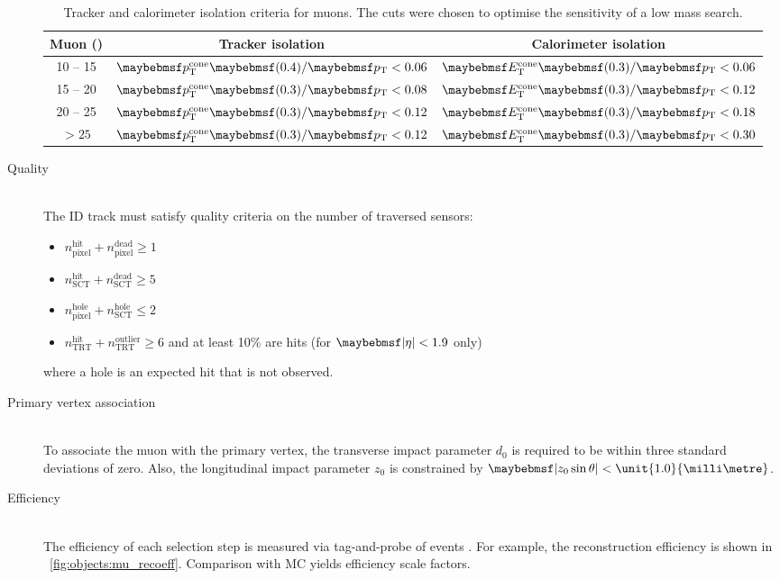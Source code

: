 \begin{description}
	\begin{table}[t]
		\begin{tabular}{c@{\hskip 0.3in}c@{\hskip 0.3in}c}
			\toprule
			Muon \pt (\GeV) & Tracker isolation & Calorimeter isolation \\
			\midrule
			10 -- 15 & $\ptcone{0.4}/\pt < 0.06$ & $\etcone{0.3}/\pt < 0.06$ \\
			15 -- 20 & $\ptcone{0.3}/\pt < 0.08$ & $\etcone{0.3}/\pt < 0.12$ \\
			20 -- 25 & $\ptcone{0.3}/\pt < 0.12$ & $\etcone{0.3}/\pt < 0.18$ \\
			$> 25$   & $\ptcone{0.3}/\pt < 0.12$ & $\etcone{0.3}/\pt < 0.30$ \\
			\bottomrule
		\end{tabular}
		\caption{Tracker and calorimeter isolation criteria for muons. The cuts were 
		chosen to optimise the sensitivity of a low mass \HWWlvlv search.}
		\label{tab:objects:mu_iso}
	\end{table}

\item[Quality] \hfill \\
	The ID track must satisfy quality criteria on the number of traversed sensors:
	\begin{itemize}[noitemsep,nolistsep]
		\item $n_{\text{pixel}}^{\text{hit}} + n_{\text{pixel}}^{\text{dead}} \geq 1$
		\item $n_{\text{SCT}}^{\text{hit}} + n_{\text{SCT}}^{\text{dead}} \geq 5$
		\item $n_{\text{pixel}}^{\text{hole}} + n_{\text{SCT}}^{\text{hole}} \leq 2$
		\item $n_{\text{TRT}}^{\text{hit}} + n_{\text{TRT}}^{\text{outlier}} \geq 6$ and 
		at least 10\% are hits (for $\mods{\eta} < 1.9$ only)
	\end{itemize}
	where a hole is an expected hit that is not observed.

\item[Primary vertex association] \hfill \\
	To associate the muon with the primary vertex, the transverse impact parameter $d_0$ 
	is required to be within three standard deviations of zero. Also, the longitudinal 
	impact parameter $z_0$ is constrained by $\mods{z_0 \sin\theta} < 
	\unit{1.0}{\milli\metre}$.

\item[Efficiency] \hfill \\
	The efficiency of each selection step is measured via tag-and-probe of 
	\HepProcess{\PZ \HepTo \Pmu\Pmu} events \cite{Muons:2012}. For example, the 
	reconstruction efficiency is shown in \Figure~\ref{fig:objects:mu_recoeff}. 
	Comparison with MC yields efficiency scale factors.


\end{description}
